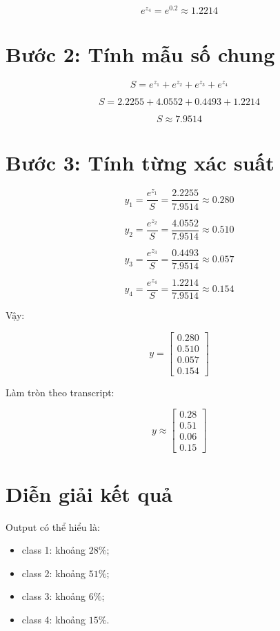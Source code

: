 \documentclass[12pt,a4paper]{report}
\begin{document}
\[
    e^{z_4}=e^{0.2}\approx 1.2214
\]

\section{Bước 2: Tính mẫu số chung}

\[
    S =
    e^{z_1}+e^{z_2}+e^{z_3}+e^{z_4}
\]

\[
    S =
    2.2255+4.0552+0.4493+1.2214
\]

\[
    S \approx 7.9514
\]

\section{Bước 3: Tính từng xác suất}

\[
    y_1 =
    \frac{e^{z_1}}{S}
    =
    \frac{2.2255}{7.9514}
    \approx 0.280
\]

\[
    y_2 =
    \frac{e^{z_2}}{S}
    =
    \frac{4.0552}{7.9514}
    \approx 0.510
\]

\[
    y_3 =
    \frac{e^{z_3}}{S}
    =
    \frac{0.4493}{7.9514}
    \approx 0.057
\]

\[
    y_4 =
    \frac{e^{z_4}}{S}
    =
    \frac{1.2214}{7.9514}
    \approx 0.154
\]

Vậy:

\[
    y =
    \begin{bmatrix}
    0.280\\
    0.510\\
    0.057\\
    0.154
    \end{bmatrix}
\]

Làm tròn theo transcript:

\[
    y \approx
    \begin{bmatrix}
    0.28\\
    0.51\\
    0.06\\
    0.15
    \end{bmatrix}
\]

\section{Diễn giải kết quả}

Output có thể hiểu là:

\begin{itemize}
    \item class 1: khoảng $28\%$;
    \item class 2: khoảng $51\%$;
    \item class 3: khoảng $6\%$;
    \item class 4: khoảng $15\%$.
\end{itemize}
\end{document}
